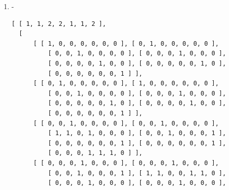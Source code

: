 \documentclass[a4paper, 10pt]{book}
\theoremstyle{definition}
\numberwithin{equation}{chapter}
\begin{document}
\begin{appendices}
\begin{enumerate}
\begin{lstlisting}[numbers=none]
	[ [ 1, 1, 2, 2, 1, 1, 2 ], 
  [ 
      [ [ 1, 0, 0, 0, 0, 0, 0 ], [ 0, 1, 0, 0, 0, 0, 0 ], 
          [ 0, 0, 1, 0, 0, 0, 0 ], [ 0, 0, 0, 1, 0, 0, 0 ], 
          [ 0, 0, 0, 0, 1, 0, 0 ], [ 0, 0, 0, 0, 0, 1, 0 ], 
          [ 0, 0, 0, 0, 0, 0, 1 ] ], 
      [ [ 0, 1, 0, 0, 0, 0, 0 ], [ 1, 0, 0, 0, 0, 0, 0 ], 
          [ 0, 0, 1, 0, 0, 0, 0 ], [ 0, 0, 0, 1, 0, 0, 0 ], 
          [ 0, 0, 0, 0, 0, 1, 0 ], [ 0, 0, 0, 0, 1, 0, 0 ], 
          [ 0, 0, 0, 0, 0, 0, 1 ] ], 
      [ [ 0, 0, 1, 0, 0, 0, 0 ], [ 0, 0, 1, 0, 0, 0, 0 ], 
          [ 1, 1, 0, 1, 0, 0, 0 ], [ 0, 0, 1, 0, 0, 0, 1 ], 
          [ 0, 0, 0, 0, 0, 0, 1 ], [ 0, 0, 0, 0, 0, 0, 1 ], 
          [ 0, 0, 0, 1, 1, 1, 0 ] ], 
      [ [ 0, 0, 0, 1, 0, 0, 0 ], [ 0, 0, 0, 1, 0, 0, 0 ], 
          [ 0, 0, 1, 0, 0, 0, 1 ], [ 1, 1, 0, 0, 1, 1, 0 ], 
          [ 0, 0, 0, 1, 0, 0, 0 ], [ 0, 0, 0, 1, 0, 0, 0 ], 
          [ 0, 0, 1, 0, 0, 0, 1 ] ], 
      [ [ 0, 0, 0, 0, 1, 0, 0 ], [ 0, 0, 0, 0, 0, 1, 0 ], 
          [ 0, 0, 0, 0, 0, 0, 1 ], [ 0, 0, 0, 1, 0, 0, 0 ], 
          [ 1, 0, 0, 0, 0, 0, 0 ], [ 0, 1, 0, 0, 0, 0, 0 ], 
          [ 0, 0, 1, 0, 0, 0, 0 ] ], 
      [ [ 0, 0, 0, 0, 0, 1, 0 ], [ 0, 0, 0, 0, 1, 0, 0 ], 
          [ 0, 0, 0, 0, 0, 0, 1 ], [ 0, 0, 0, 1, 0, 0, 0 ], 
          [ 0, 1, 0, 0, 0, 0, 0 ], [ 1, 0, 0, 0, 0, 0, 0 ], 
          [ 0, 0, 1, 0, 0, 0, 0 ] ], 
      [ [ 0, 0, 0, 0, 0, 0, 1 ], [ 0, 0, 0, 0, 0, 0, 1 ], 
          [ 0, 0, 0, 1, 1, 1, 0 ], [ 0, 0, 1, 0, 0, 0, 1 ], 
          [ 0, 0, 1, 0, 0, 0, 0 ], [ 0, 0, 1, 0, 0, 0, 0 ], 
          [ 1, 1, 0, 1, 0, 0, 0 ] ] ] ]
	\end{lstlisting}
	\item -\begin{lstlisting}[numbers=none]
	[ [ 1, 1, 2, 2, 1, 1, 2 ], 
  [ 
      [ [ 1, 0, 0, 0, 0, 0, 0 ], [ 0, 1, 0, 0, 0, 0, 0 ], 
          [ 0, 0, 1, 0, 0, 0, 0 ], [ 0, 0, 0, 1, 0, 0, 0 ], 
          [ 0, 0, 0, 0, 1, 0, 0 ], [ 0, 0, 0, 0, 0, 1, 0 ], 
          [ 0, 0, 0, 0, 0, 0, 1 ] ], 
      [ [ 0, 1, 0, 0, 0, 0, 0 ], [ 1, 0, 0, 0, 0, 0, 0 ], 
          [ 0, 0, 1, 0, 0, 0, 0 ], [ 0, 0, 0, 1, 0, 0, 0 ], 
          [ 0, 0, 0, 0, 0, 1, 0 ], [ 0, 0, 0, 0, 1, 0, 0 ], 
          [ 0, 0, 0, 0, 0, 0, 1 ] ], 
      [ [ 0, 0, 1, 0, 0, 0, 0 ], [ 0, 0, 1, 0, 0, 0, 0 ], 
          [ 1, 1, 0, 1, 0, 0, 0 ], [ 0, 0, 1, 0, 0, 0, 1 ], 
          [ 0, 0, 0, 0, 0, 0, 1 ], [ 0, 0, 0, 0, 0, 0, 1 ], 
          [ 0, 0, 0, 1, 1, 1, 0 ] ], 
      [ [ 0, 0, 0, 1, 0, 0, 0 ], [ 0, 0, 0, 1, 0, 0, 0 ], 
          [ 0, 0, 1, 0, 0, 0, 1 ], [ 1, 1, 0, 0, 1, 1, 0 ], 
          [ 0, 0, 0, 1, 0, 0, 0 ], [ 0, 0, 0, 1, 0, 0, 0 ], 

\end{lstlisting}
\end{enumerate}
\end{appendices}
\end{document}
